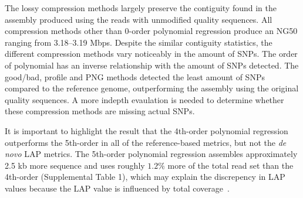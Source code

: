 \documentclass{bioinfo}
\begin{document}
The lossy compression methods largely preserve the contiguity found in the assembly produced using the reads with unmodified quality sequences. All compression methods other than 0-order polynomial regression produce an NG50 ranging from 3.18--3.19 Mbps. Despite the similar contiguity statistics, the different compression methods vary noticeably in the amount of SNPs. The order of polynomial has an inverse relationship with the amount of SNPs detected.
The good/bad, profile and PNG methods detected the least amount of SNPs compared to the reference genome, outperforming the assembly using the original quality sequences.
A more indepth evaulation is needed to determine whether these compression methods are missing actual SNPs.

It is important to highlight the result that the 4th-order polynomial regression outperforms the 5th-order in all of the reference-based metrics, but not the \emph{de novo} LAP metrics. The 5th-order polynomial regression assembles approximately 2.5 kb more sequence and uses roughly $1.2\%$ more of the total read set than the 4th-order (Supplemental Table 1), which may explain the discrepency in LAP values because the LAP value is influenced by total coverage~\cite{ghodsi2013novo}.
\end{document}
